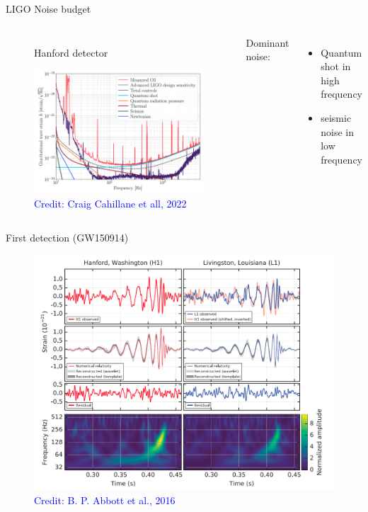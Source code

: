 \documentclass[pdf]{beamer}
\newcommand{\credit}[1]{\tiny{\textcolor{blue}{Credit: #1}}}
\begin{document}
\begin{frame}{LIGO Noise budget}
\begin{columns}
\begin{figure}
\caption*{Hanford detector}
\includegraphics[scale=.17]{fig/noise-budget-ligo.png}
\caption*{\credit{Craig Cahillane et all, 2022}}
\end{figure}

Dominant noise:

\begin{itemize}
\item  
Quantum shot in high frequency

\item  
seismic noise in low frequency
\end{itemize}

\end{columns}
\end{frame}

\begin{frame}{First detection (GW150914)}
\begin{figure}
\includegraphics[scale=.2]{fig/GW150914.png}
\caption*{\credit{B. P. Abbott et al., 2016}}
\end{figure}
\end{frame}
\end{document}
